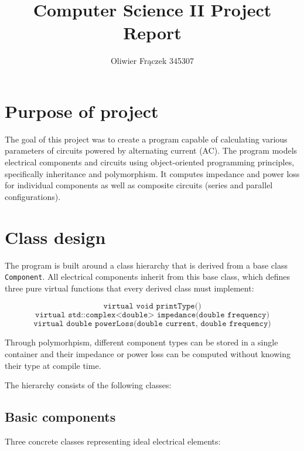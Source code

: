 \documentclass{article}
\title{Computer Science II Project Report}
\author{Oliwier Fr\k{a}czek 345307}
\begin{document}
\maketitle

    \section{Purpose of project}
    The goal of this project was to create a program capable of calculating various parameters of circuits powered by alternating current (AC).
    The program models electrical components and circuits using object-oriented programming principles, specifically inheritance and polymorphism.
    It computes impedance and power loss for individual components as well as composite circuits (series and parallel configurations).

    \section{Class design}
    The program is built around a class hierarchy that is derived from a base class \texttt{Component}. All electrical components inherit from this base class,
    which defines three pure virtual functions that every derived class must implement:
    
    \begin{equation*}
        \texttt{virtual void printType()}
    \end{equation*}
    \begin{equation*}
        \texttt{virtual std::complex<double> impedance(double frequency)}
    \end{equation*}
    \begin{equation*}
        \texttt{virtual double powerLoss(double current, double frequency)}
    \end{equation*}

    Through polymorhpism, different component types can be stored in a single container and their impedance or power loss can be computed without knowing their type at compile time.

    The hierarchy consists of the following classes:

    \subsection{Basic components}
    Three concrete classes representing ideal electrical elements:
\end{document}
